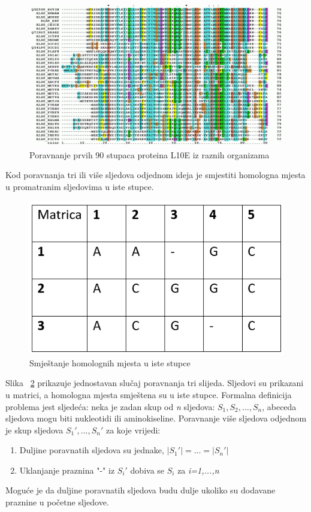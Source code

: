 \documentclass[times, utf8, zavrsni, numeric]{fer}
\begin{document}
\begin{figure}[htb]
	\includegraphics[width=\linewidth]{slike/msaWiki.PNG}
	\centering
	\caption{Poravnanje prvih 90 stupaca proteina L10E iz raznih organizama }
	\label{fig:msaWiki}
\end{figure}

Kod poravnanja tri ili više sljedova odjednom ideja je smjestiti homologna mjesta u promatranim sljedovima u iste stupce. 
\begin{figure}[htb]
	\includegraphics[]{slike/msaPrv.PNG}
	\centering
	\caption{Smještanje homolognih mjesta u iste stupce}
	\label{fig:msaPrv}
\end{figure}
Slika ~\ref{fig:msaPrv} prikazuje jednostavan slučaj poravnanja tri slijeda. Sljedovi su prikazani u matrici, a homologna mjesta smještena su u iste stupce.
Formalna definicija problema jest sljedeća:
neka je zadan skup od \textit{n} sljedova: $S_1, S_2,...,S_n$, abeceda sljedova mogu biti nukleotidi ili aminokiseline. Poravnanje više sljedova odjednom je skup sljedova $S_1',...,S_n'$ za koje vrijedi:
\begin{enumerate}
	\item Duljine poravnatih sljedova su jednake, $|S_1'|=...=|S_n'|$
	\item Uklanjanje praznina "-" iz $S_i'$ dobiva se $S_i$ za \textit{i=1,...,n}	
\end{enumerate}
Moguće je da duljine poravnatih sljedova budu dulje ukoliko su dodavane praznine u početne sljedove.
\end{document}
